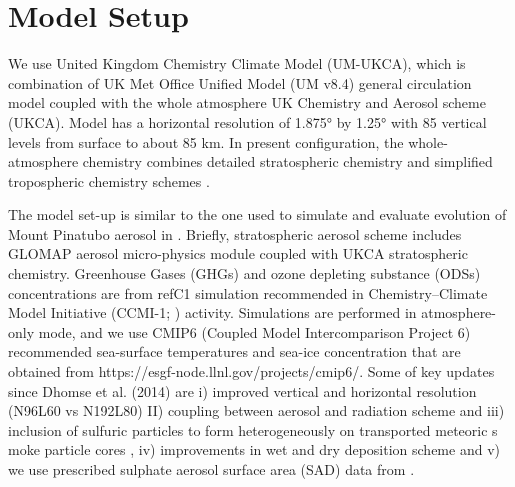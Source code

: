 \documentclass[acpd, hvmath, online]{copernicus_discussions}
\begin{document}
\section{Model Setup}
We use United Kingdom Chemistry Climate Model (UM-UKCA), which is combination of  
UK Met Office Unified Model (UM v8.4) general circulation model coupled
with the whole atmosphere UK Chemistry and Aerosol scheme (UKCA). 
Model has a horizontal resolution of 1.875° by 1.25° with 85 vertical 
levels from surface to about 85 km. In present configuration,  
the whole-atmosphere chemistry combines detailed 
stratospheric chemistry and simplified tropospheric chemistry schemes
 \citep{Morgenstern2009, Oconnor2014}. 


The model set-up is similar to the one used to simulate and evaluate evolution of 
Mount Pinatubo aerosol in \citep{Dhomse2014}. Briefly, stratospheric aerosol
scheme includes GLOMAP aerosol micro-physics module coupled with UKCA stratospheric
 chemistry. Greenhouse Gases (GHGs) and ozone depleting substance (ODSs) 
concentrations are from refC1 simulation recommended in  
Chemistry–Climate Model Initiative (CCMI-1; \cite{Eyring2013, Morgenstern2017})
 activity. Simulations are  performed in atmosphere-only mode, and we use CMIP6 
(Coupled Model Intercomparison Project 6) recommended  sea-surface temperatures 
and sea-ice concentration that are obtained from https://esgf-node.llnl.gov/projects/cmip6/.  
Some of key updates since  Dhomse et al. (2014) are i) improved vertical and horizontal 
resolution (N96L60 vs N192L80) II) coupling between aerosol and radiation scheme \citep{Mann2015} and 
iii) inclusion of sulfuric particles to form heterogeneously on transported meteoric s
moke particle cores \citep{Brooks2017}, iv) improvements in wet and dry deposition scheme 
\citet{Marshall2018} and v) we use prescribed sulphate aerosol surface area (SAD)
 data from \cite{Arfeuille2013}. 
\end{document}
